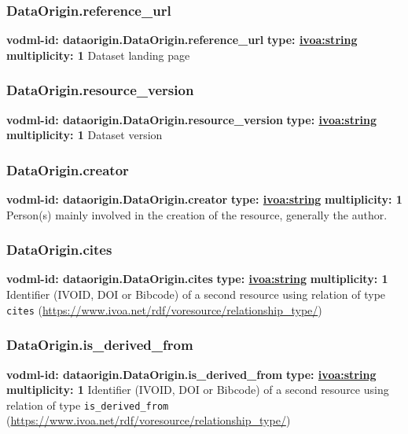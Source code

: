     \subsubsection{DataOrigin.reference_url}
      \textbf{vodml-id: dataorigin.DataOrigin.reference_url} \newline
      \textbf{type: \hyperref[sect:ivoa]{ivoa:string}} \newline
      \textbf{multiplicity: 1} \newline
      Dataset landing page

    \subsubsection{DataOrigin.resource_version}
      \textbf{vodml-id: dataorigin.DataOrigin.resource_version} \newline
      \textbf{type: \hyperref[sect:ivoa]{ivoa:string}} \newline
      \textbf{multiplicity: 1} \newline
      Dataset version

    \subsubsection{DataOrigin.creator}
      \textbf{vodml-id: dataorigin.DataOrigin.creator} \newline
      \textbf{type: \hyperref[sect:ivoa]{ivoa:string}} \newline
      \textbf{multiplicity: 1} \newline
      Person(s) mainly involved in the creation of the resource, generally the author.

    \subsubsection{DataOrigin.cites}
      \textbf{vodml-id: dataorigin.DataOrigin.cites} \newline
      \textbf{type: \hyperref[sect:ivoa]{ivoa:string}} \newline
      \textbf{multiplicity: 1} \newline
      Identifier (IVOID, DOI or Bibcode) of a second resource using relation of type \texttt{cites} (\url{https://www.ivoa.net/rdf/voresource/relationship\_type/})

    \subsubsection{DataOrigin.is_derived_from}
      \textbf{vodml-id: dataorigin.DataOrigin.is_derived_from} \newline
      \textbf{type: \hyperref[sect:ivoa]{ivoa:string}} \newline
      \textbf{multiplicity: 1} \newline
      Identifier (IVOID, DOI or Bibcode) of a second resource using relation of type \texttt{is\_derived\_from} (\url{https://www.ivoa.net/rdf/voresource/relationship\_type/})

